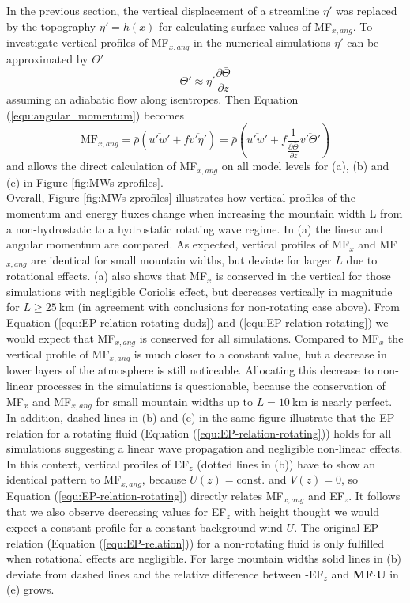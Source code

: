 In the previous section, the vertical displacement of a streamline $\eta'$ was replaced by the topography $\eta'=h(x)$ for calculating surface values of MF$_{x,ang}$. To investigate vertical profiles of MF$_{x,ang}$ in the numerical simulations $\eta'$ can be approximated by $\Theta'$
\begin{equation}
    \Theta' \approx  \eta' \frac{\partial \bar{\Theta}}{\partial z}
    \label{equ:thprime}
\end{equation}
assuming an adiabatic flow along isentropes. Then Equation (\ref{equ:angular_momentum}) becomes
\begin{equation}
    \mathrm{MF}_{x,ang} = \bar{\rho} (\overbar{u'w'} + f \overbar{v' \eta'}) = \bar{\rho} (\overbar{u'w'} + f \frac{1}{\frac{\partial \bar{\Theta}}{\partial z}}\overbar{v' \Theta'})
    \label{equ:angular_momentum_theta}
\end{equation}
and allows the direct calculation of MF$_{x,ang}$ on all model levels for (a), (b) and (e) in Figure \ref{fig:MWs-zprofiles}. \\ 
Overall, Figure \ref{fig:MWs-zprofiles} illustrates how vertical profiles of the momentum and energy fluxes change when increasing the mountain width L from a non-hydrostatic to a hydrostatic rotating wave regime. In (a) the linear and angular momentum are compared. As expected, vertical profiles of MF$_x$ and MF$_{x,ang}$ are identical for small mountain widths, but deviate for larger $L$ due to rotational effects. (a) also shows that MF$_x$ is conserved in the vertical for those simulations with negligible Coriolis effect, but decreases vertically in magnitude for $L \geq \SI{25}{\kilo\meter}$ (in agreement with conclusions for non-rotating case above). From Equation (\ref{equ:EP-relation-rotating-dudz}) and (\ref{equ:EP-relation-rotating}) we would expect that MF$_{x,ang}$ is conserved for all simulations. Compared to MF$_x$ the vertical profile of MF$_{x,ang}$ is much closer to a constant value, but a decrease in lower layers of the atmosphere is still noticeable. Allocating this decrease to non-linear processes in the simulations is questionable, because the conservation of MF$_x$ and MF$_{x,ang}$ for small mountain widths up to $L=\SI{10}{\kilo\meter}$ is nearly perfect. In addition, dashed lines in (b) and (e) in the same figure illustrate that the EP-relation for a rotating fluid (Equation (\ref{equ:EP-relation-rotating})) holds for all simulations suggesting a linear wave propagation and negligible non-linear effects. In this context, vertical profiles of EF$_z$ (dotted lines in (b)) have to show an identical pattern to MF$_{x,ang}$, because $U(z)=$const. and $V(z)=0$, so Equation (\ref{equ:EP-relation-rotating}) directly relates MF$_{x,ang}$ and EF$_z$. It follows that we also observe decreasing values for EF$_z$ with height thought we would expect a constant profile for a constant background wind $U$. The original EP-relation (Equation (\ref{equ:EP-relation})) for a non-rotating fluid is only fulfilled when rotational effects are negligible. For large mountain widths solid lines in (b) deviate from dashed lines and the relative difference between -EF$_z$ and \textbf{MF}$\cdot$\textbf{U} in (e) grows. \\
